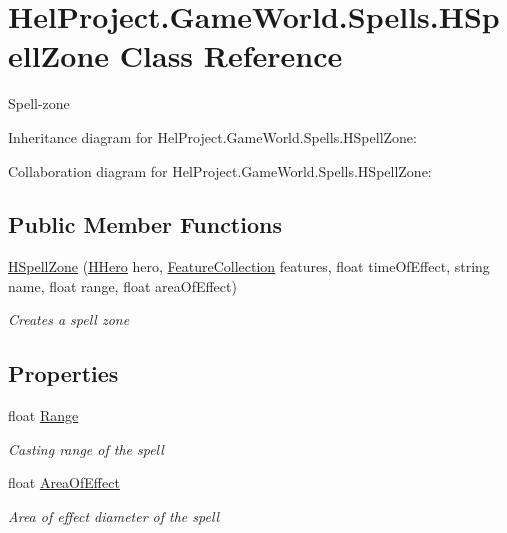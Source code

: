 \hypertarget{class_hel_project_1_1_game_world_1_1_spells_1_1_h_spell_zone}{}\section{Hel\+Project.\+Game\+World.\+Spells.\+H\+Spell\+Zone Class Reference}
\label{class_hel_project_1_1_game_world_1_1_spells_1_1_h_spell_zone}


Spell-\/zone  




Inheritance diagram for Hel\+Project.\+Game\+World.\+Spells.\+H\+Spell\+Zone\+:


Collaboration diagram for Hel\+Project.\+Game\+World.\+Spells.\+H\+Spell\+Zone\+:
\subsection*{Public Member Functions}
\begin{DoxyCompactItemize}
\item 
\hyperlink{class_hel_project_1_1_game_world_1_1_spells_1_1_h_spell_zone_a50d483de52dff05af4fa7b4ca32e641c}{H\+Spell\+Zone} (\hyperlink{class_hel_project_1_1_game_world_1_1_entities_1_1_h_hero}{H\+Hero} hero, \hyperlink{class_hel_project_1_1_features_1_1_feature_collection}{Feature\+Collection} features, float time\+Of\+Effect, string name, float range, float area\+Of\+Effect)
\begin{DoxyCompactList}\small\item\em Creates a spell zone \end{DoxyCompactList}\end{DoxyCompactItemize}
\subsection*{Properties}
\begin{DoxyCompactItemize}
\item 
float \hyperlink{class_hel_project_1_1_game_world_1_1_spells_1_1_h_spell_zone_ad3b44aced22248c0aaf4b63e5c62e491}{Range}
\begin{DoxyCompactList}\small\item\em Casting range of the spell \end{DoxyCompactList}\item 
float \hyperlink{class_hel_project_1_1_game_world_1_1_spells_1_1_h_spell_zone_aa5d5de1c0e032de623b3a9a471f95f3a}{Area\+Of\+Effect}
\begin{DoxyCompactList}\small\item\em Area of effect diameter of the spell \end{DoxyCompactList}\end{DoxyCompactItemize}


